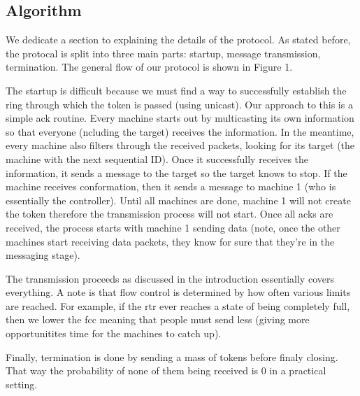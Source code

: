\documentclass[12pt,journal,compsoc]{IEEEtran}
\begin{document}
\subsection{Algorithm}
We dedicate a section to explaining the details of the protocol. As stated before, the protocal is split into three main parts: startup, message transmission, termination. The general flow of our protocol is shown in Figure 1.

The startup is difficult because we must find a way to successfully establish the ring through which the token is passed (using unicast). Our approach to this is a simple ack routine. Every machine starts out by multicasting its own information so that everyone (ncluding the target) receives the information. In the meantime, every machine also filters through the received packets, looking for its target (the machine with the next sequential ID). Once it successfully receives the information, it sends a message to the target so the target knows to stop. If the machine receives conformation, then it sends a message to machine 1 (who is essentially the controller). Until all machines are done, machine 1 will not create the token therefore the transmission process will not start. Once all acks are received, the process starts with machine 1 sending data (note, once the other machines start receiving data packets, they know for sure that they're in the messaging stage).

The transmission proceeds as discussed in the introduction essentially covers everything. A note is that flow control is determined by how often various limits are reached. For example, if the rtr ever reaches a state of being completely full, then we lower the fcc meaning that people must send less (giving more opportunitites time for the machines to catch up).

Finally, termination is done by sending a mass of tokens before finaly closing. That way the probability of none of them being received is 0 in a practical setting.
\end{document}
